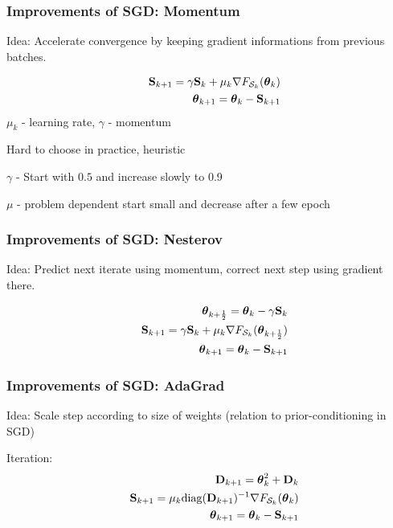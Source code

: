 \documentclass[12pt,fleqn,handout]{beamer}
\begin{document}
\begin{frame}[fragile]\frametitle{Improvements of SGD: Momentum}

Idea: Accelerate convergence by keeping gradient informations from previous batches.


\begin{eqnarray*}
&& {\bf S}_{k+1} = \gamma {\bf S}_k  +\mu_k  \nabla F_{{\cal S}_k}({\boldsymbol \theta}_k) \\
&& {\boldsymbol \theta}_{k+1} = {\boldsymbol \theta}_k  - {\bf S}_{k+1}
\end{eqnarray*}
$\mu_k$ - learning rate, $\gamma$ - momentum 


\bigskip
\pause

Hard to choose in practice, heuristic

$\gamma$ - Start with $0.5$ and increase slowly to 0.9

$\mu$ - problem dependent start small and decrease after a few epoch


\end{frame}

\begin{frame}\frametitle{Improvements of SGD: Nesterov}

	Idea: Predict next iterate using momentum, correct next step using gradient there.
	
	\begin{eqnarray*}
	&& {\boldsymbol \theta}_{k+\frac 12} = {\boldsymbol \theta}_k  - \gamma {\bf S}_{k} \\
	&& {\bf S}_{k+1} = \gamma {\bf S}_k  + \mu_k  \nabla F_{{\cal S}_k}({{\boldsymbol \theta}_{k+\frac12}}) \\
	&& {\boldsymbol \theta}_{k+1} = {\boldsymbol \theta}_k  - {\bf S}_{k+1}
	\end{eqnarray*}
\end{frame}

\begin{frame}
	\frametitle{Improvements of SGD: AdaGrad}
	
	Idea: Scale step according to size of weights (relation to prior-conditioning in SGD)
	
	\bigskip
	
	
	Iteration:
	\begin{eqnarray*}
	&& {\bf D}_{k+1} = {\boldsymbol \theta}_k^2 + {\bf D}_k \\
	&& {\bf S}_{k+1} =  \mu_k {\rm diag}({\bf D}_{k+1})^{-1} \nabla F_{{\cal S}_k}({\boldsymbol \theta}_{k}) \\
	&& {\boldsymbol \theta}_{k+1} = {\boldsymbol \theta}_k  - {\bf S}_{k+1}
	\end{eqnarray*}
	
	
\end{frame}
\end{document}
